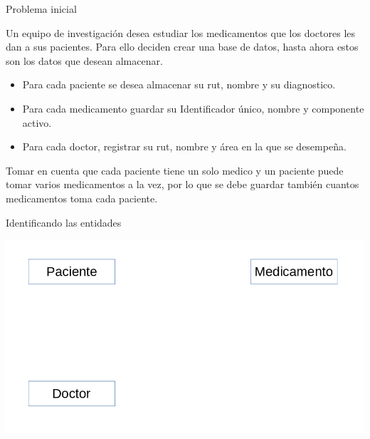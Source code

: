 \documentclass[11pt]{beamer}
\begin{document}




\begin{frame}{Problema inicial}

Un equipo de investigación desea estudiar los medicamentos que los doctores les dan a sus pacientes. Para ello deciden crear una base de datos, hasta ahora estos son los datos que desean almacenar.

\begin{itemize}



\item Para cada paciente se desea almacenar su rut, nombre y su diagnostico.

\item Para cada medicamento guardar su Identificador único, nombre y componente activo.

\item Para cada doctor, registrar su rut, nombre y área en la que se desempeña.

\end{itemize}

Tomar en cuenta que cada paciente tiene un solo medico y un paciente puede tomar varios medicamentos a la vez, por lo que se debe guardar también cuantos medicamentos toma cada paciente.

\end{frame}


\begin{frame}{Identificando las entidades}

\begin{center}
\includegraphics[scale=.5]{images/1} 
\end{center}


\end{frame}
\end{document}
